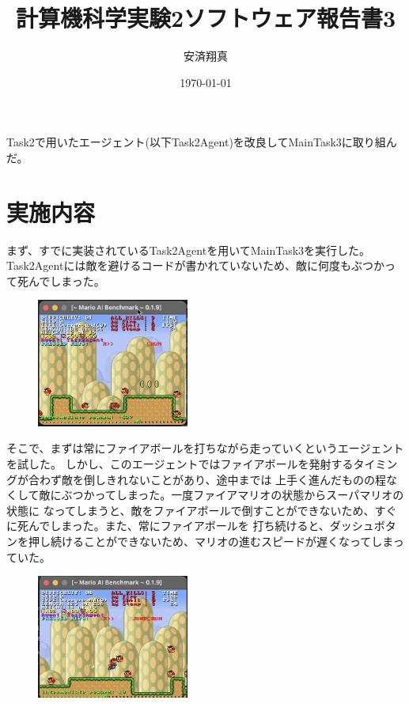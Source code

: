 \documentclass[a4paper,11pt]{jsarticle}
\begin{document}
\title{計算機科学実験2ソフトウェア報告書3}
\author{安済翔真}
\date{\today}
\maketitle

Task2で用いたエージェント(以下Task2Agent)を改良してMainTask3に取り組んだ。

\section*{実施内容}

まず、すでに実装されているTask2Agentを用いてMainTask3を実行した。
Task2Agentには敵を避けるコードが書かれていないため、敵に何度もぶつかって死んでしまった。

\begin{figure}[h]
  \centering
  \includegraphics*[width=50mm]{
    images/report3/task2-agent.png
  }
  \caption[図1]{}
\end{figure}

そこで、まずは常にファイアボールを打ちながら走っていくというエージェントを試した。
しかし、このエージェントではファイアボールを発射するタイミングが合わず敵を倒しきれないことがあり、途中までは
上手く進んだものの程なくして敵にぶつかってしまった。一度ファイアマリオの状態からスーパマリオの状態に
なってしまうと、敵をファイアボールで倒すことができないため、すぐに死んでしまった。また、常にファイアボールを
打ち続けると、ダッシュボタンを押し続けることができないため、マリオの進むスピードが遅くなってしまっていた。


\begin{figure}
  \begin{center}
    \includegraphics*[width=50mm]{images/report3/falling-enemy.png}
    \caption[図2]{}
  \end{center}
\end{figure}
\end{document}

